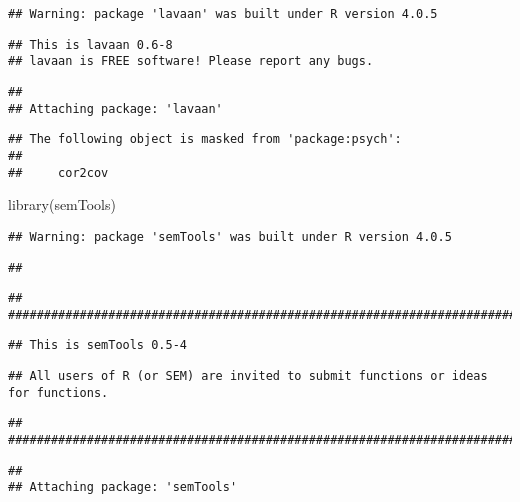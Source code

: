 \documentclass[
]{article}
\newenvironment{Shaded}{\begin{snugshade}}{\end{snugshade}}
\newcommand{\FunctionTok}[1]{\textcolor[rgb]{0.00,0.00,0.00}{#1}}
\newcommand{\NormalTok}[1]{#1}
\begin{document}
\begin{verbatim}
## Warning: package 'lavaan' was built under R version 4.0.5
\end{verbatim}

\begin{verbatim}
## This is lavaan 0.6-8
## lavaan is FREE software! Please report any bugs.
\end{verbatim}

\begin{verbatim}
## 
## Attaching package: 'lavaan'
\end{verbatim}

\begin{verbatim}
## The following object is masked from 'package:psych':
## 
##     cor2cov
\end{verbatim}

\begin{Shaded}
\begin{Highlighting}[]
\FunctionTok{library}\NormalTok{(semTools)}
\end{Highlighting}
\end{Shaded}

\begin{verbatim}
## Warning: package 'semTools' was built under R version 4.0.5
\end{verbatim}

\begin{verbatim}
## 
\end{verbatim}

\begin{verbatim}
## ###############################################################################
\end{verbatim}

\begin{verbatim}
## This is semTools 0.5-4
\end{verbatim}

\begin{verbatim}
## All users of R (or SEM) are invited to submit functions or ideas for functions.
\end{verbatim}

\begin{verbatim}
## ###############################################################################
\end{verbatim}

\begin{verbatim}
## 
## Attaching package: 'semTools'
\end{verbatim}
\end{document}

